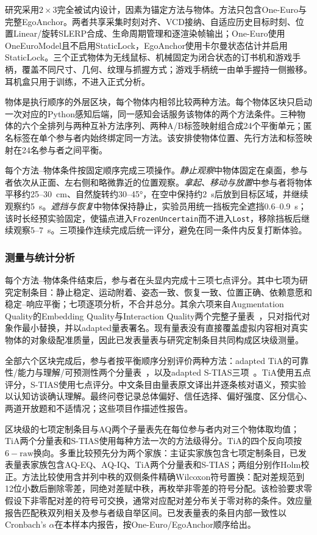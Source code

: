 \documentclass[review]{vgtc}
\begin{document}
研究采用$2 \times 3$完全被试内设计，因素为锚定方法与物体。方法只包含One-Euro与完整EgoAnchor。两者共享采集时刻对齐、VCD接纳、自适应历史目标时刻、位置Linear/旋转SLERP合成、生命周期管理和逐渲染帧输出；One-Euro使用OneEuroModel且不启用StaticLock，EgoAnchor使用卡尔曼状态估计并启用StaticLock。三个正式物体为无线鼠标、机械固定为闭合状态的订书机和游戏手柄，覆盖不同尺寸、几何、纹理与抓握方式；游戏手柄统一由单手握持一侧搬移。耳机盒只用于训练，不进入正式分析。

物体是执行顺序的外层区块，每个物体内相邻比较两种方法。每个物体区块只启动一次对应的Python感知后端，同一感知会话服务该物体的两个方法条件。三种物体的六个全排列与两种互补方法序列、两种A/B标签映射组合成24个平衡单元；匿名标签在单个参与者内始终绑定同一方法。该安排使物体位置、先行方法和标签映射在24名参与者之间平衡。

每个方法--物体条件按固定顺序完成三项操作。\emph{静止观察}中物体固定在桌面，参与者依次从正面、左右侧和略微靠近的位置观察。\emph{拿起、移动与放置}中参与者将物体平移约25--30~cm、自然旋转约30--45°，在空中保持约2~s后放到目标区域，并继续观察约5~s。\emph{遮挡与恢复}中物体保持静止，实验员用统一挡板完全遮挡0.6--0.9~s；该时长经预实验固定，使锚点进入\texttt{FrozenUncertain}而不进入\texttt{Lost}，移除挡板后继续观察5--7~s。三项操作连续完成后统一评分，避免在同一条件内反复打断体验。

\subsubsection{测量与统计分析}

每个方法--物体条件结束后，参与者在头显内完成十三项七点评分。其中七项为研究定制条目：静止稳定、运动附着、姿态一致、恢复一致、位置正确、依赖意愿和稳定--响应平衡；七项逐项分析，不合并总分。其余六项来自Augmentation Quality的Embedding Quality与Interaction Quality两个完整子量表~\cite{schein2025aq}，只对指代对象作最小替换，并以adapted量表署名。现有量表没有直接覆盖虚拟内容相对真实物体的对象级配准质量，因此已发表量表与研究定制条目共同构成区块级测量。

全部六个区块完成后，参与者按平衡顺序分别评价两种方法：adapted TiA的可靠性/能力与理解/可预测性两个分量表~\cite{koerber2019tia}，以及adapted S-TIAS三项~\cite{mcgrath2025stias}。TiA使用五点评分，S-TIAS使用七点评分。中文条目由量表原文译出并逐条核对语义，预实验以认知访谈确认理解。最终问卷记录总体偏好、信任选择、偏好强度、区分信心、两道开放题和不适情况；这些项目作描述性报告。

区块级的七项定制条目与AQ两个子量表先在每位参与者内对三个物体取均值；TiA两个分量表和S-TIAS使用每种方法一次的方法级得分。TiA的四个反向项按$6-\mathrm{raw}$换向。多重比较预先分为两个家族：主证实家族包含七项定制条目，已发表量表家族包含AQ-EQ、AQ-IQ、TiA两个分量表和S-TIAS；两组分别作Holm校正。方法比较使用含并列中秩的双侧条件精确Wilcoxon符号置换：配对差规范到12位小数后删除零差，同绝对差赋中秩，再枚举非零差的符号分配。该检验要求零假设下非零配对差的符号可交换，通常对应配对差分布关于零对称的条件。效应量报告匹配秩双列相关及参与者级自举区间。已发表量表的条目内部一致性以Cronbach's $\alpha$在本样本内报告，按One-Euro/EgoAnchor顺序给出。
\end{document}
